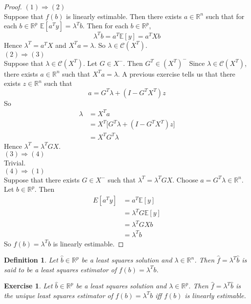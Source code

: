 \documentclass[12pt]{amsart}
\newtheorem{defn}[thm]{Definition}
\newtheorem{ex}[thm]{Exercise}
\newcommand{\lam}{\lambda}
\newcommand{\E}{\mathbb{E}}
\newcommand{\R}{\mathbb{R}}
\newcommand{\MC}{\mathcal{C}}
\begin{document}
\begin{proof} $(1) \Rightarrow (2)$\\
Suppose that $f(b)$ is linearly estimable. Then there exists $a \in \R^n$ such that for each $b \in \R^p$ $\E[a^Ty] = \lambda^Tb$. Then for each $b \in \R^p$, $$\lambda^Tb = a^T\E[y] = a^TXb$$ Hence $\lam^T = a^TX$ and $X^Ta = \lam$. So $\lam \in \MC(X^T)$. \vspace{4mm} \\
$(2) \Rightarrow (3)$\\ 
Suppose that $\lam \in \MC(X^T)$. Let $G \in X^-$. Then $G^T \in (X^T)^-$ Since $\lam \in \MC(X^T)$, there exists $a \in \R^n$ such that $ X^Ta = \lam$. A previous exercise tells us that there exists $z \in \R^n$ such that $$a = G^T \lam + (I-G^TX^T)z$$
So 
\begin{align*}
\lam 
&= X^Ta \\
&= X^T \big[ G^T \lam + (I-G^TX^T)z \big] \\
&= X^TG^T \lam
\end{align*}
Hence $\lam^T = \lam^T G X$.\vspace{4mm}\\
$(3) \Rightarrow (4)$\\
Trivial.\vspace{4mm}\\
$(4) \Rightarrow (1)$\\
Suppose that there exists $G \in X^-$ such that $\lam^T = \lam^T G X$. Choose $a = G^T\lam \in \R^n$. Let $b \in \R^p$. Then 
\begin{align*}
E[a^Ty] 
&= a^T\E[y] \\
&= \lam^TG\E[y] \\ 
&= \lam^TGXb \\
&= \lam^Tb
\end{align*}
So $f(b) = \lam^Tb$ is linearly estimable.
\end{proof}

\begin{defn}
Let $\hat{b} \in \R^p$ be a least squares solution and $\lam \in \R^n$. Then $\hat{f} = \lam^T \hat{b}$ is said to be a least squares estimator of $f(b) = \lam^T b$. 
\end{defn}

\begin{ex}
Let $\hat{b} \in \R^p$ be a least squares solution and $\lam \in \R^p$. Then $\hat{f} = \lam^T \hat{b}$ is the unique least squares estimator of $f(b) = \lam^Tb$ iff $f(b)$ is linearly estimable. 
\end{ex}
\end{document}
